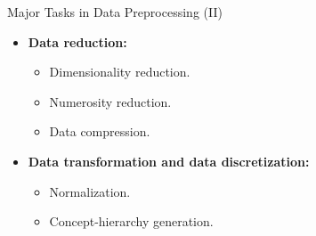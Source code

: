 \begin{frame}{Major Tasks in Data Preprocessing (II)}
	\begin{itemize}
		\item \textbf{Data reduction:}
		\begin{itemize}
			\item Dimensionality reduction.
			\item Numerosity reduction.
			\item Data compression.
		\end{itemize}
		\item \textbf{Data transformation and data discretization:}
		\begin{itemize}
			\item Normalization.
			\item Concept-hierarchy generation.
		\end{itemize}
	\end{itemize}
\end{frame}